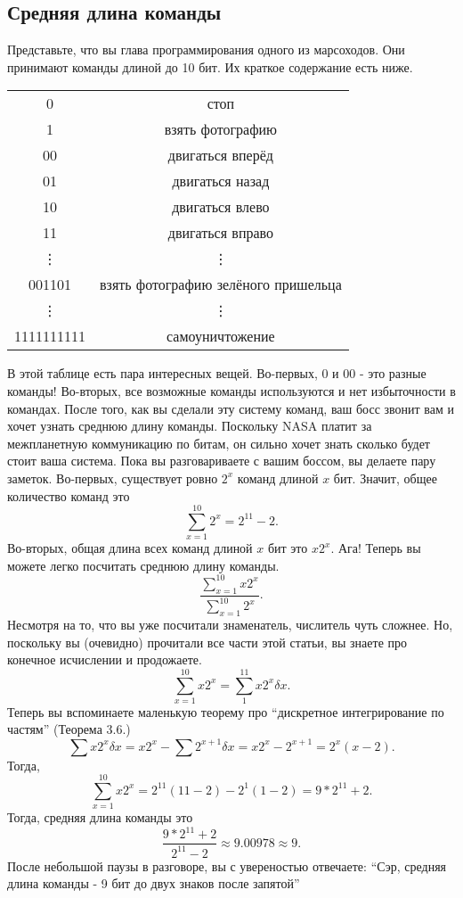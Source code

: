 \documentclass{article}
\begin{document}
\subsection{Средняя длина команды}
Представьте, что вы глава программирования одного из марсоходов. Они принимают команды длиной до 10 бит. Их краткое содержание есть ниже.


\begin{center}
\begin{tabular}{c c}
0 & стоп \\
1 & взять фотографию \\
00 & двигаться вперёд \\
01 & двигаться назад \\
10 & двигаться влево \\
11 & двигаться вправо \\
\vdots & \vdots \\
001101 & взять фотографию зелёного пришельца \\
\vdots & \vdots \\
1111111111 & самоуничтожение
\end{tabular}
\end{center}

В этой таблице есть пара интересных вещей. Во-первых, 0 и 00 - это разные команды! Во-вторых, все возможные команды используются и нет избыточности в командах.
После того, как вы сделали эту систему команд, ваш босс звонит вам и хочет узнать среднюю длину команды. Поскольку NASA платит за межпланетную коммуникацию по битам, он сильно хочет знать сколько будет стоит ваша система.
Пока вы разговариваете с вашим боссом, вы делаете пару заметок.
Во-первых, существует ровно $2^x$ команд длиной $x$ бит.
Значит, общее количество команд это
$$\sum_{x=1}^{10} 2^x=2^{11}-2.$$
Во-вторых, общая длина всех команд длиной $x$ бит это $x2^x$. Ага! Теперь вы можете легко посчитать среднюю длину команды.
$$\frac{\sum_{x=1}^{10} x2^x}{\sum_{x=1}^{10} 2^x}.$$
Несмотря на то, что вы уже посчитали знаменатель, числитель чуть сложнее. Но, поскольку вы (очевидно) прочитали все части этой статьи, вы знаете про конечное исчислении и продожаете.
$$\sum_{x=1}^{10} x2^x=\sum_1^{11} x2^x \delta x.$$
Теперь вы вспоминаете маленькую теорему про ``дискретное интегрирование по частям'' (Теорема 3.6.)
$$\sum x2^x\delta x=x2^x-\sum 2^{x+1}\delta x=x2^x-2^{x+1}=2^x (x-2).$$
Тогда,
$$\sum_{x=1}^{10} x2^x=2^{11} (11-2)-2^1 (1-2)=9*2^{11}+2.$$
Тогда, средняя длина команды это
$$\frac{9*2^{11}+2}{2^{11}-2} \approx 9.00978 \approx 9.$$
После небольшой паузы в разговоре, вы с увереностью отвечаете: ``Сэр, средняя длина команды - 9 бит до двух знаков после запятой''
\end{document}
